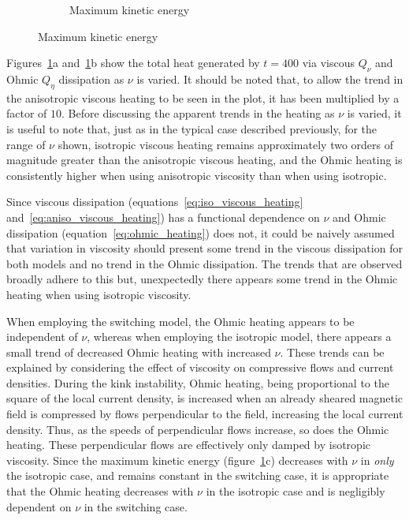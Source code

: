 \begin{figure}[t]
\begin{subfigure}[t]{0.32\textwidth}
      \caption{Maximum kinetic energy}
    \end{subfigure}
    \label{fig:param_study_varying_viscosity}
\end{figure}

Figures~\ref{fig:param_study_varying_viscosity}a and~\ref{fig:param_study_varying_viscosity}b show the total heat generated by $t=400$ via viscous $Q_{\nu}$ and Ohmic $Q_{\eta}$ dissipation as $\nu$ is varied. It should be noted that, to allow the trend in the anisotropic viscous heating to be seen in the plot, it has been multiplied by a factor of $10$. Before discussing the apparent trends in the heating as $\nu$ is varied, it is useful to note that, just as in the typical case described previously, for the range of $\nu$ shown, isotropic viscous heating remains approximately two orders of magnitude greater than the anisotropic viscous heating, and the Ohmic heating is consistently higher when using anisotropic viscosity than when using isotropic.

Since viscous dissipation (equations~\eqref{eq:iso_viscous_heating} and~\eqref{eq:aniso_viscous_heating}) has a functional dependence on $\nu$ and Ohmic dissipation (equation~\eqref{eq:ohmic_heating}) does not, it could be naively assumed that variation in viscosity should present some trend in the viscous dissipation for both models and no trend in the Ohmic dissipation. The trends that are observed broadly adhere to this but, unexpectedly there appears some trend in the Ohmic heating when using isotropic viscosity.

When employing the switching model, the Ohmic heating appears to be independent of $\nu$, whereas when employing the isotropic model, there appears a small trend of decreased Ohmic heating with increased $\nu$. These trends can be explained by considering the effect of viscosity on compressive flows and current densities. During the kink instability, Ohmic heating, being proportional to the square of the local current density, is increased when an already sheared magnetic field is compressed by flows perpendicular to the field, increasing the local current density. Thus, as the speeds of perpendicular flows increase, so does the Ohmic heating. These perpendicular flows are effectively only damped by isotropic viscosity. Since the maximum kinetic energy (figure~\ref{fig:param_study_varying_viscosity}c) decreases with $\nu$ in \emph{only} the isotropic case, and remains constant in the switching case, it is appropriate that the Ohmic heating decreases with $\nu$ in the isotropic case and is negligibly dependent on $\nu$ in the switching case.

